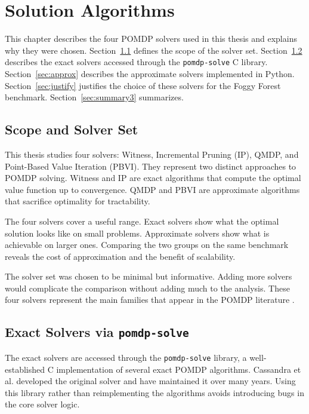 \chapter{Solution Algorithms}
\label{chap:algorithms}

This chapter describes the four POMDP solvers used in this thesis and explains why they were chosen.
Section~\ref{sec:scope} defines the scope of the solver set.
Section~\ref{sec:exact} describes the exact solvers accessed through the \texttt{pomdp-solve} C library.
Section~\ref{sec:approx} describes the approximate solvers implemented in Python.
Section~\ref{sec:justify} justifies the choice of these solvers for the Foggy Forest benchmark.
Section~\ref{sec:summary3} summarizes.


\section{Scope and Solver Set}
\label{sec:scope}

This thesis studies four solvers: Witness, Incremental Pruning (IP), QMDP, and Point-Based Value Iteration (PBVI).
They represent two distinct approaches to POMDP solving.
Witness and IP are exact algorithms that compute the optimal value function up to convergence.
QMDP and PBVI are approximate algorithms that sacrifice optimality for tractability.

The four solvers cover a useful range.
Exact solvers show what the optimal solution looks like on small problems.
Approximate solvers show what is achievable on larger ones.
Comparing the two groups on the same benchmark reveals the cost of approximation and the benefit of scalability.

The solver set was chosen to be minimal but informative.
Adding more solvers would complicate the comparison without adding much to the analysis.
These four solvers represent the main families that appear in the POMDP literature \cite{shaniSurveyPointbasedPOMDP2013}.


\section{Exact Solvers via \texttt{pomdp-solve}}
\label{sec:exact}

The exact solvers are accessed through the \texttt{pomdp-solve} library, a well-established C implementation of several exact POMDP algorithms.
Cassandra et al. \cite{cassandra1994acting} developed the original solver and have maintained it over many years.
Using this library rather than reimplementing the algorithms avoids introducing bugs in the core solver logic.

